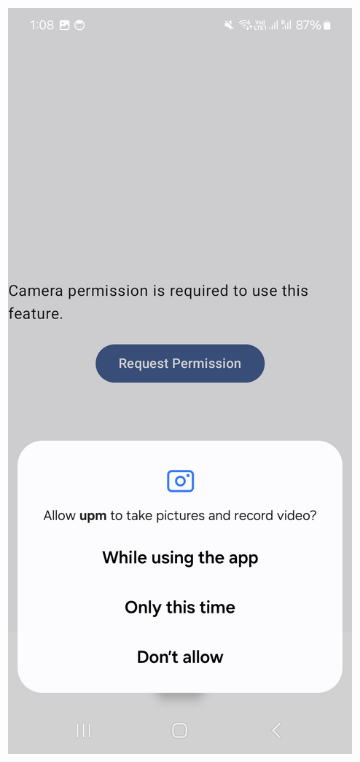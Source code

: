 \begin{figure}[h]
    \centering

    \begin{subfigure}[b]{0.3\textwidth}
        \centering
        \includegraphics[width=\textwidth]{img/permissions-screen.jpg}

\end{subfigure}
\end{figure}
